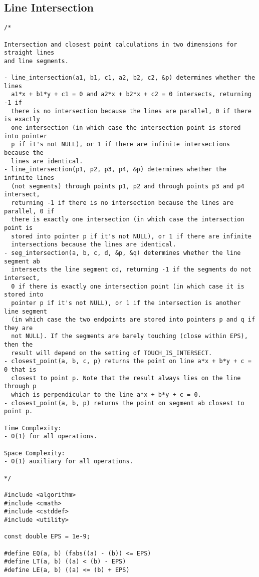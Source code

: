 \subsection{Line Intersection}
\begin{lstlisting}
/*

Intersection and closest point calculations in two dimensions for straight lines
and line segments.

- line_intersection(a1, b1, c1, a2, b2, c2, &p) determines whether the lines
  a1*x + b1*y + c1 = 0 and a2*x + b2*x + c2 = 0 intersects, returning -1 if
  there is no intersection because the lines are parallel, 0 if there is exactly
  one intersection (in which case the intersection point is stored into pointer
  p if it's not NULL), or 1 if there are infinite intersections because the
  lines are identical.
- line_intersection(p1, p2, p3, p4, &p) determines whether the infinite lines
  (not segments) through points p1, p2 and through points p3 and p4 intersect,
  returning -1 if there is no intersection because the lines are parallel, 0 if
  there is exactly one intersection (in which case the intersection point is
  stored into pointer p if it's not NULL), or 1 if there are infinite
  intersections because the lines are identical.
- seg_intersection(a, b, c, d, &p, &q) determines whether the line segment ab
  intersects the line segment cd, returning -1 if the segments do not intersect,
  0 if there is exactly one intersection point (in which case it is stored into
  pointer p if it's not NULL), or 1 if the intersection is another line segment
  (in which case the two endpoints are stored into pointers p and q if they are
  not NULL). If the segments are barely touching (close within EPS), then the
  result will depend on the setting of TOUCH_IS_INTERSECT.
- closest_point(a, b, c, p) returns the point on line a*x + b*y + c = 0 that is
  closest to point p. Note that the result always lies on the line through p
  which is perpendicular to the line a*x + b*y + c = 0.
- closest_point(a, b, p) returns the point on segment ab closest to point p.

Time Complexity:
- O(1) for all operations.

Space Complexity:
- O(1) auxiliary for all operations.

*/

#include <algorithm>
#include <cmath>
#include <cstddef>
#include <utility>

const double EPS = 1e-9;

#define EQ(a, b) (fabs((a) - (b)) <= EPS)
#define LT(a, b) ((a) < (b) - EPS)
#define LE(a, b) ((a) <= (b) + EPS)


\end{lstlisting}
